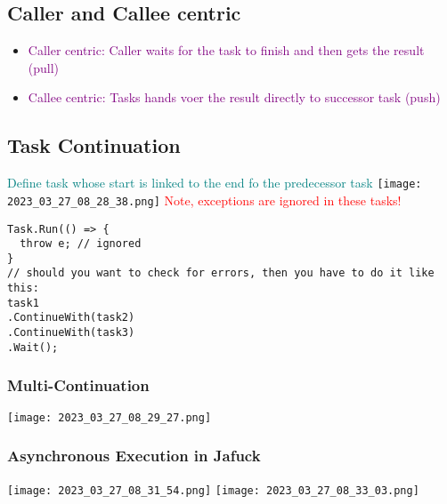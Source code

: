 \documentclass[main.tex,fontsize=8pt,paper=a4,paper=portrait,DIV=calc,]{scrartcl}
\begin{document}
\subsection{Caller and Callee centric}
\begin{itemize}
  \item \textcolor{purple}{Caller centric: Caller waits for the task to finish and then gets the result (pull)}
\item \textcolor{purple}{Callee centric: Tasks hands voer the result directly to successor task (push)}
\end{itemize} 

\subsection{Task Continuation}
\textcolor{teal}{Define task whose start is linked to the end fo the predecessor task}\newline
\texttt{[image: 2023\_03\_27\_08\_28\_38.png]}\newline
\textcolor{red}{Note, exceptions are ignored in these tasks!}\newline
\begin{lstlisting}
Task.Run(() => {
  throw e; // ignored
}
// should you want to check for errors, then you have to do it like this:
task1
.ContinueWith(task2)
.ContinueWith(task3)
.Wait();
\end{lstlisting}

\subsubsection{Multi-Continuation}
\texttt{[image: 2023\_03\_27\_08\_29\_27.png]}

\subsubsection{Asynchronous Execution in Jafuck}
\texttt{[image: 2023\_03\_27\_08\_31\_54.png]}\newline
\texttt{[image: 2023\_03\_27\_08\_33\_03.png]}
\end{document}
